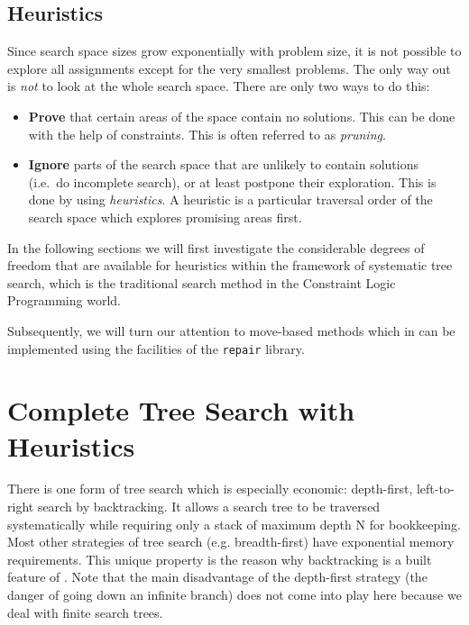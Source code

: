 \subsection{Heuristics}

Since search space sizes grow exponentially with problem size,
it is not possible to explore all assignments except for the
very smallest problems.
The only way out is {\em not} to look at the whole search space.
There are only two ways to do this:
\begin{itemize}
\item {\bf Prove} that certain areas of the space contain no solutions.
    This can be done with the help of constraints. This is often referred
    to as {\em pruning}.
\item {\bf Ignore} parts of the search space that are unlikely to contain
    solutions (i.e.\ do incomplete search), or at least postpone their exploration.
    This is done by using {\em heuristics}.
    A heuristic is a particular traversal order of the search space
    which explores promising areas first.
\end{itemize}

In the following sections we will first investigate the considerable
degrees of freedom that are available for heuristics within the framework of
systematic tree search, which is the traditional search method
in the Constraint Logic Programming world.

Subsequently, we will turn our attention to move-based methods
which in {\eclipse} can be implemented using the facilities of the 
{\tt repair} library.


\section{Complete Tree Search with Heuristics}

There is one form of tree search which is especially economic: 
depth-first, left-to-right search by backtracking.  It allows
a search tree to be traversed systematically while requiring only a stack
of maximum depth N for bookkeeping.  Most other strategies of tree
search (e.g.  breadth-first) have exponential memory requirements. 
This unique property is the reason why backtracking is a built feature
of {\eclipse}.  Note that the main disadvantage of the depth-first
strategy (the danger of going down an infinite branch) does not come
into play here because we deal with finite search trees.


